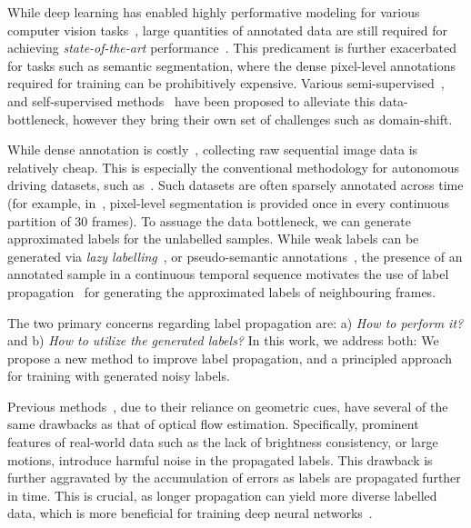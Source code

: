 

While deep learning has enabled highly performative modeling for various computer vision tasks~\cite{sota_imclass, sota_objdet}, large quantities of annotated data are still required for achieving \textit{state-of-the-art} performance~\cite{alex2019big}. This predicament is further exacerbated for tasks such as semantic segmentation, where the dense pixel-level annotations required for training can be prohibitively expensive. Various semi-supervised~\cite{semi_aug_2, domain_seg_nips_2, semi_sup_seg_1}, and self-supervised methods~\cite{self_sup_aaai, self_sup_iccv} have been proposed to alleviate this data-bottleneck, however they bring their own set of challenges such as domain-shift.

While dense annotation is costly~\cite{benenson2019large,kuznetsova2018open,cs_dataset}, collecting raw sequential image data is relatively cheap. This is especially the conventional methodology for autonomous driving datasets, such as~\cite{cs_dataset, as_dataset, argo_dataset}. Such datasets are often sparsely annotated across time (for example, in~\cite{cs_dataset}, pixel-level segmentation is provided once in every continuous partition of 30 frames). To assuage the data bottleneck, we can generate approximated labels for the unlabelled samples. 
While weak labels can be generated via \textit{lazy labelling}~\cite{lazy_label}, or pseudo-semantic annotations~\cite{taskonomy2018,pseudo_nips_1}, 
 the presence of an annotated sample in a continuous temporal sequence motivates the use of label propagation~\cite{lp_2006, lp_2010} for generating the approximated labels of neighbouring frames. 
 
\let\clearpage\relax


The two primary concerns regarding label propagation are: a) \textit{How to perform it?} and b) \textit{How to utilize the generated labels?} In this work, we address both: We propose a new method to improve label propagation, and a principled approach for training with generated noisy labels. 

Previous methods~\cite{lp_iccvw, lp_eccv, nvidia_cvpr19}, due to their reliance on geometric cues, have several of the same drawbacks as that of optical flow estimation. Specifically, prominent features of real-world data such as the lack of brightness consistency, or large motions, introduce harmful noise in the propagated labels. This drawback is further aggravated by the accumulation of errors as labels are propagated further in time. This is crucial, as longer propagation can yield more diverse labelled data, which is more beneficial for training deep neural networks~\cite{lp_eccv}.

